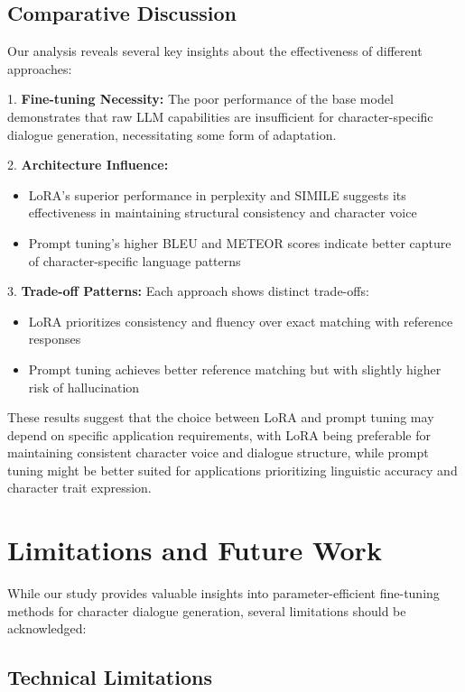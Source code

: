 \documentclass{article}
\begin{document}
\subsection{Comparative Discussion}

Our analysis reveals several key insights about the effectiveness of different approaches:

1. \textbf{Fine-tuning Necessity:} The poor performance of the base model demonstrates that raw LLM capabilities are insufficient for character-specific dialogue generation, necessitating some form of adaptation.

2. \textbf{Architecture Influence:} 
\begin{itemize}
\item LoRA's superior performance in perplexity and SIMILE suggests its effectiveness in maintaining structural consistency and character voice
\item Prompt tuning's higher BLEU and METEOR scores indicate better capture of character-specific language patterns
\end{itemize}

3. \textbf{Trade-off Patterns:} Each approach shows distinct trade-offs:
\begin{itemize}
\item LoRA prioritizes consistency and fluency over exact matching with reference responses
\item Prompt tuning achieves better reference matching but with slightly higher risk of hallucination
\end{itemize}

These results suggest that the choice between LoRA and prompt tuning may depend on specific application requirements, with LoRA being preferable for maintaining consistent character voice and dialogue structure, while prompt tuning might be better suited for applications prioritizing linguistic accuracy and character trait expression.



\section{Limitations and Future Work}

While our study provides valuable insights into parameter-efficient fine-tuning methods for character dialogue generation, several limitations should be acknowledged:

\subsection{Technical Limitations}
\end{document}
